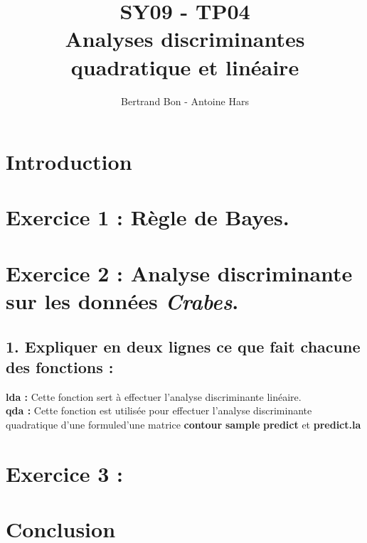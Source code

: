 \documentclass[a4paper, 10pt]{article}
\title{SY09 - TP04\\Analyses discriminantes quadratique et linéaire}
\author{Bertrand Bon - Antoine Hars}
\begin{document}
\maketitle

\section*{Introduction}


\section*{Exercice 1 : Règle de Bayes.}

\subsection*{}

\subsection*{}

\section*{Exercice 2 : Analyse discriminante sur les données \textit{Crabes}.}

\subsection*{1. Expliquer en deux lignes ce que fait chacune des fonctions :}
\textbf{lda :} Cette fonction sert à effectuer l'analyse discriminante linéaire.\\
\textbf{qda :} Cette fonction est utilisée pour effectuer l'analyse discriminante quadratique d'une formuled'une matrice
\textbf{contour}
\textbf{sample}
\textbf{predict} et \textbf{predict.la}
\subsection*{}
\subsection*{}
\subsection*{}

\section*{Exercice 3 : }

\subsection*{}
\subsection*{}
\subsection*{}

\section*{Conclusion}
\end{document}

